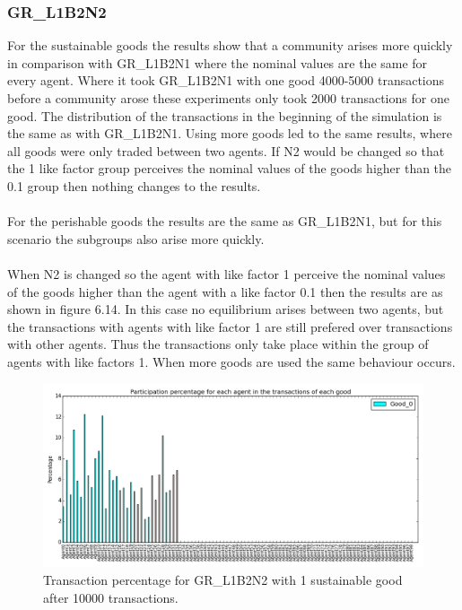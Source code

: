\documentclass[twoside,openright]{uva-bachelor-thesis}
\begin{document}
\clearpage
\subsubsection{GR\_L1B2N2}
For the sustainable goods the results show that a community arises more quickly in comparison with GR\_L1B2N1 where the nominal values are the same for every agent. Where it took GR\_L1B2N1 with one good 4000-5000 transactions before a community arose these experiments only took 2000 transactions for one good. The distribution of the transactions in the beginning of the simulation is the same as with GR\_L1B2N1. Using more goods led to the same results, where all goods were only traded between two agents. If N2 would be changed so that the 1 like factor group perceives the nominal values of the goods higher than the 0.1 group then nothing changes to the results.\\
\\
For the perishable goods the results are the same as GR\_L1B2N1, but for this scenario the subgroups also arise more quickly.
\\
\\
When N2 is changed so the agent with like factor 1 perceive the nominal values of the goods higher than the agent with a like factor 0.1 then the results are as shown in figure 6.14. In this case no equilibrium arises between two agents, but the transactions with agents with like factor 1 are still prefered over transactions with other agents. Thus the transactions only take place within the group of agents with like factors 1. When more goods are used the same behaviour occurs. \\
\begin{figure}[h!]
  \centering
  \includegraphics[scale=0.4]{Simulation2_figures/GR_L1B2N2_321/Figure1_10k} 
  \caption{Transaction percentage for GR\_L1B2N2 with 1 sustainable good after 10000 transactions.}
\end{figure}
\end{document}
